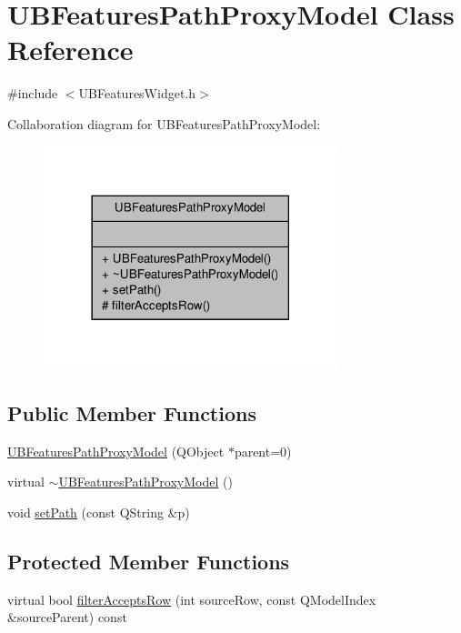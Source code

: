 \hypertarget{class_u_b_features_path_proxy_model}{\section{U\-B\-Features\-Path\-Proxy\-Model Class Reference}
\label{db/d92/class_u_b_features_path_proxy_model}
}


{\ttfamily \#include $<$U\-B\-Features\-Widget.\-h$>$}



Collaboration diagram for U\-B\-Features\-Path\-Proxy\-Model\-:
\nopagebreak
\begin{figure}[H]
\begin{center}
\leavevmode
\includegraphics[width=242pt]{de/dc5/class_u_b_features_path_proxy_model__coll__graph}
\end{center}
\end{figure}
\subsection*{Public Member Functions}
\begin{DoxyCompactItemize}
\item 
\hyperlink{class_u_b_features_path_proxy_model_a2ebc5eddcc1ad3306593a3a239d9c985}{U\-B\-Features\-Path\-Proxy\-Model} (Q\-Object $\ast$parent=0)
\item 
virtual \hyperlink{class_u_b_features_path_proxy_model_a5b077829bb5c3bd6b013f538c4ecb186}{$\sim$\-U\-B\-Features\-Path\-Proxy\-Model} ()
\item 
void \hyperlink{class_u_b_features_path_proxy_model_aeb39e9a8ac4d6290984ae6678664fc5f}{set\-Path} (const Q\-String \&p)
\end{DoxyCompactItemize}
\subsection*{Protected Member Functions}
\begin{DoxyCompactItemize}
\item 
virtual bool \hyperlink{class_u_b_features_path_proxy_model_afd1ce83e15f4ed5e8ba18f03fcd8ed1e}{filter\-Accepts\-Row} (int source\-Row, const Q\-Model\-Index \&source\-Parent) const 
\end{DoxyCompactItemize}


